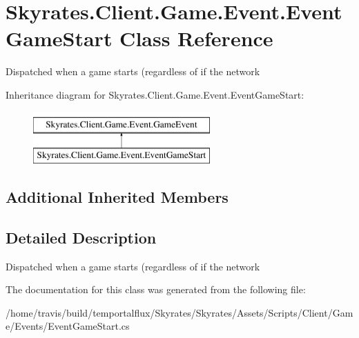 \hypertarget{class_skyrates_1_1_client_1_1_game_1_1_event_1_1_event_game_start}{\section{Skyrates.\-Client.\-Game.\-Event.\-Event\-Game\-Start Class Reference}
\label{class_skyrates_1_1_client_1_1_game_1_1_event_1_1_event_game_start}
}


Dispatched when a game starts (regardless of if the network  


Inheritance diagram for Skyrates.\-Client.\-Game.\-Event.\-Event\-Game\-Start\-:\begin{figure}[H]
\begin{center}
\leavevmode
\includegraphics[height=2.000000cm]{class_skyrates_1_1_client_1_1_game_1_1_event_1_1_event_game_start}
\end{center}
\end{figure}
\subsection*{Additional Inherited Members}


\subsection{Detailed Description}
Dispatched when a game starts (regardless of if the network 



The documentation for this class was generated from the following file\-:\begin{DoxyCompactItemize}
\item 
/home/travis/build/temportalflux/\-Skyrates/\-Skyrates/\-Assets/\-Scripts/\-Client/\-Game/\-Events/Event\-Game\-Start.\-cs\end{DoxyCompactItemize}

